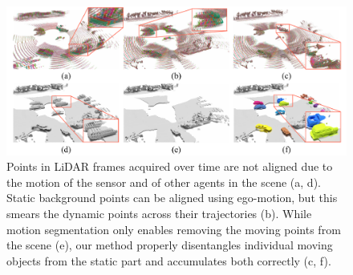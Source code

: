\begin{figure}[th!]
    \centering
    \includegraphics[width=\columnwidth]{figs/figure/teaser.pdf}
    \caption{Points in LiDAR frames acquired over time are not aligned due to the motion of the sensor and of other agents in the scene (a, d). Static background points can be aligned using ego-motion, but this smears the dynamic points across their trajectories (b). While motion segmentation only enables removing the moving points from the scene (e), our method properly disentangles individual moving objects from the static part and accumulates both correctly (c, f).}
   \label{fig:teaser}
\end{figure}